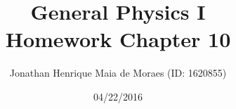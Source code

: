 \title{General Physics I \\ Homework Chapter 10}
\author{Jonathan Henrique Maia de Moraes (ID: 1620855)}
\date{04/22/2016}
\maketitle
